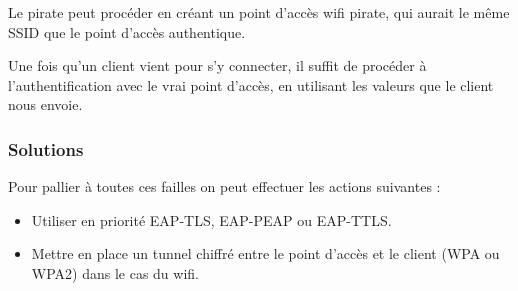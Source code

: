 Le pirate peut procéder en créant un point d'accès wifi pirate, qui aurait le même SSID que le point d'accès authentique. 

Une fois qu'un client vient pour s'y connecter, il suffit de procéder à l'authentification avec le vrai point d'accès, en utilisant les valeurs que le client nous envoie. 

\subsubsection{Solutions}

Pour pallier à toutes ces failles on peut effectuer les actions suivantes : 
\begin{itemize}
\item Utiliser en priorité EAP-TLS, EAP-PEAP ou EAP-TTLS. 
\item Mettre en place un tunnel chiffré entre le point d’accès et le client (WPA ou WPA2) dans le cas du wifi. 
\end{itemize}
